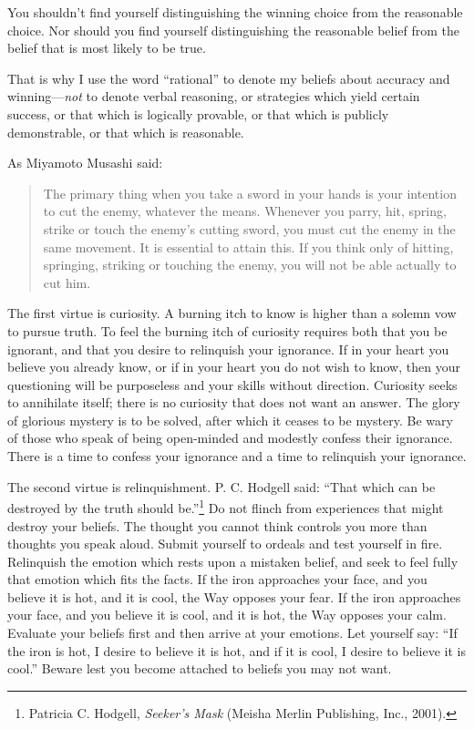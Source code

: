 {
 You shouldn't find yourself distinguishing the
winning choice from the reasonable choice. Nor should you find yourself
distinguishing the reasonable belief from the belief that is most
likely to be true.}

{
 That is why I use the word
``rational'' to denote my beliefs
about accuracy and winning---\textit{not} to denote verbal reasoning,
or strategies which yield certain success, or that which is logically
provable, or that which is publicly demonstrable, or that which is
reasonable.}

{
 As Miyamoto Musashi said:}

\begin{quote}
{
 The primary thing when you take a sword in your hands is your
intention to cut the enemy, whatever the means. Whenever you parry,
hit, spring, strike or touch the enemy's cutting sword,
you must cut the enemy in the same movement. It is essential to attain
this. If you think only of hitting, springing, striking or touching the
enemy, you will not be able actually to cut him.}
\end{quote}

\myendsectiontext

\label{twelve_virtues}

{
 The first virtue is curiosity. A burning itch to know is higher
than a solemn vow to pursue truth. To feel the burning itch of
curiosity requires both that you be ignorant, and that you desire to
relinquish your ignorance. If in your heart you believe you already
know, or if in your heart you do not wish to know, then your
questioning will be purposeless and your skills without direction.
Curiosity seeks to annihilate itself; there is no curiosity that does
not want an answer. The glory of glorious mystery is to be solved,
after which it ceases to be mystery. Be wary of those who speak of
being open-minded and modestly confess their ignorance. There is a time
to confess your ignorance and a time to relinquish your ignorance.}

{
 The second virtue is relinquishment. P. C. Hodgell said:
``That which can be destroyed by the truth should
be.''\footnote{Patricia C. Hodgell, \textit{Seeker's Mask}
(Meisha Merlin Publishing, Inc., 2001).} Do not flinch from
experiences that might destroy your beliefs. The thought you cannot
think controls you more than thoughts you speak aloud. Submit yourself
to ordeals and test yourself in fire. Relinquish the emotion which
rests upon a mistaken belief, and seek to feel fully that emotion which
fits the facts. If the iron approaches your face, and you believe it is
hot, and it is cool, the Way opposes your fear. If the iron approaches
your face, and you believe it is cool, and it is hot, the Way opposes
your calm. Evaluate your beliefs first and then arrive at your
emotions. Let yourself say: ``If the iron is hot, I
desire to believe it is hot, and if it is cool, I desire to believe it
is cool.'' Beware lest you become attached to beliefs
you may not want.}

